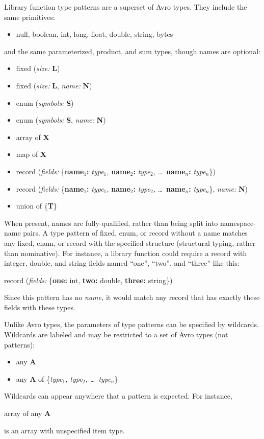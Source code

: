 \documentclass{article}
\newcommand{\PFAp}{\ttfamily\bfseries}
\newcommand{\PFAtp}{\ttfamily\bfseries}
\newcommand{\PFApf}{\ttfamily\bfseries}
\theoremstyle{definition}
\begin{document}
Library function type patterns are a superset of Avro types.  They include the same primitives:
\begin{itemize}
\item null, boolean, int, long, float, double, string, bytes
\end{itemize}
and the same parameterized, product, and sum types, though names are optional:
\begin{itemize}
\item fixed ({\it size:} {\PFAtp L})
\item fixed ({\it size:} {\PFAtp L}, {\it name:} {\PFAtp N})
\item enum ({\it symbols:} {\PFAtp S})
\item enum ({\it symbols:} {\PFAtp S}, {\it name:} {\PFAtp N})
\item array of {\PFAtp X}
\item map of {\PFAtp X}
\item record ({\it fields:} \{{\PFApf name$_1$:} {\it type$_1$,} {\PFApf name$_2$:} {\it type$_2$,} \ldots\ {\PFApf name$_n$:} {\it type$_n$}\})
\item record ({\it fields:} \{{\PFApf name$_1$:} {\it type$_1$,} {\PFApf name$_2$:} {\it type$_2$,} \ldots\ {\PFApf name$_n$:} {\it type$_n$}\}, {\it name:} {\PFAtp N})
\item union of \{{\PFAtp T}\}
\end{itemize}
When present, names are fully-qualified, rather than being split into namespace-name pairs.  A type pattern of fixed, enum, or record without a name matches any fixed, enum, or record with the specified structure (structural typing, rather than nominative).  For instance, a library function could require a record with integer, double, and string fields named ``one'', ``two'', and ``three'' like this:
\begin{center}
\begin{minipage}{0.9\linewidth}
record ({\it fields:} \{{\PFApf one:} int, {\PFApf two:} double, {\PFApf three:} string\})
\end{minipage}
\end{center}
Since this pattern has no {\it name,} it would match any record that has exactly these fields with these types.

Unlike Avro types, the parameters of type patterns can be specified by wildcards.  Wildcards are labeled and may be restricted to a set of Avro types (not patterns):
\begin{itemize}
\item any {\PFAp A}
\item any {\PFAp A} of \{{\it type$_1$, type$_2$, \ldots\ type$_n$}\}
\end{itemize}
Wildcards can appear anywhere that a pattern is expected.  For instance,
\begin{center}
\begin{minipage}{0.9\linewidth}
array of any {\PFAp A}
\end{minipage}
\end{center}
is an array with unspecified item type.
\end{document}
